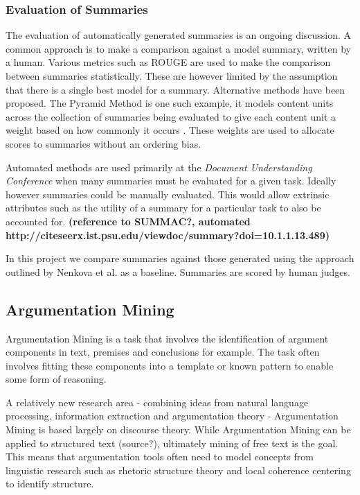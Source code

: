       \subsubsection{Evaluation of Summaries}
        The evaluation of automatically generated summaries is an ongoing discussion. A common approach is to make a comparison against a model summary, written by a human. Various metrics such as ROUGE \cite{lin2004rouge} are used to make the comparison between summaries statistically. These are however limited by the assumption that there is a single best model for a summary. Alternative methods have been proposed. The Pyramid Method is one such example, it models content units across the collection of summaries being evaluated to give each content unit a weight based on how commonly it occurs \cite{nenkova2004evaluating}. These weights are used to allocate scores to summaries without an ordering bias.

        Automated methods are used primarily at the \textit{Document Understanding Conference} when many summaries must be evaluated for a given task. Ideally however summaries could be manually evaluated. This would allow extrinsic attributes such as the utility of a summary for a particular task to also be accounted for. \textbf{(reference to SUMMAC?, automated http://citeseerx.ist.psu.edu/viewdoc/summary?doi=10.1.1.13.489)}

        In this project we compare summaries against those generated using the approach outlined by Nenkova et al. \cite{nenkova2006compositional} as a baseline. Summaries are scored by human judges.

    \tocless\subsection{Argumentation Mining}
      Argumentation Mining is a task that involves the identification of argument components in text, premises and conclusions for example. The task often involves fitting these components into a template or known pattern to enable some form of reasoning. \cite{palau2009argumentation}

      A relatively new research area - combining ideas from natural language processing, information extraction and argumentation theory - Argumentation Mining is based largely on discourse theory. While Argumentation Mining can be applied to structured text (source?), ultimately mining of free text is the goal. This means that argumentation tools often need to model concepts from linguistic research such as rhetoric structure theory \cite{mann1988rhetorical} and local coherence centering \cite{weinstein21centering} to identify structure.

